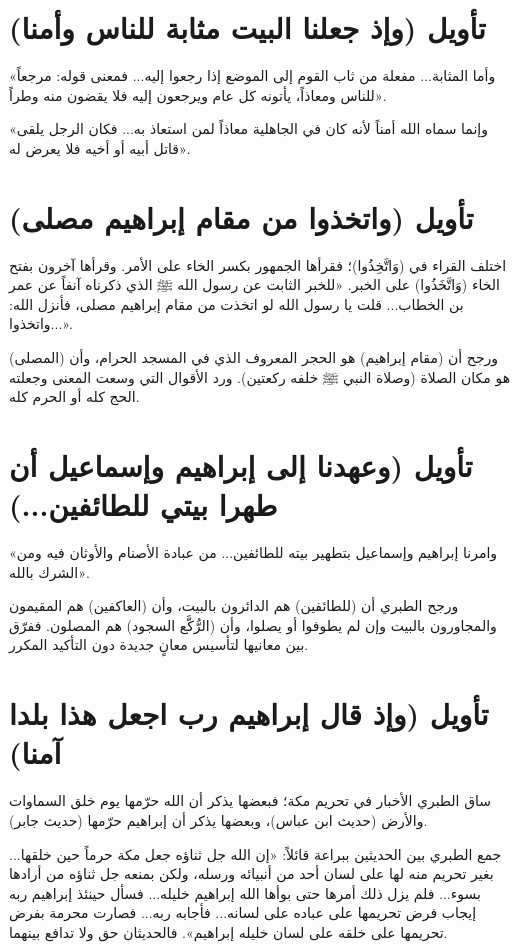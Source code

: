 \separator

\section{تأويل (وإذ جعلنا البيت مثابة للناس وأمنا)}
 «وأما المثابة... مفعلة من ثاب القوم إلى الموضع إذا رجعوا إليه... فمعنى قوله: مرجعاً للناس ومعاذاً، يأتونه كل عام ويرجعون إليه فلا يقضون منه وطراً».

 «وإنما سماه الله أمناً لأنه كان في الجاهلية معاذاً لمن استعاذ به... فكان الرجل يلقى قاتل أبيه أو أخيه فلا يعرض له».

\separator

\section{تأويل (واتخذوا من مقام إبراهيم مصلى)}
اختلف القراء في (وَاتَّخِذُوا)؛ فقرأها الجمهور بكسر الخاء على الأمر. وقرأها آخرون بفتح الخاء (وَاتَّخَذُوا) على الخبر.
 «للخبر الثابت عن رسول الله ﷺ الذي ذكرناه آنفاً عن عمر بن الخطاب... قلت يا رسول الله لو اتخذت من مقام إبراهيم مصلى، فأنزل الله: واتخذوا...».

ورجح أن (مقام إبراهيم) هو الحجر المعروف الذي في المسجد الحرام، وأن (المصلى) هو مكان الصلاة (وصلاة النبي ﷺ خلفه ركعتين). ورد الأقوال التي وسعت المعنى وجعلته الحج كله أو الحرم كله.

\separator

\section{تأويل (وعهدنا إلى إبراهيم وإسماعيل أن طهرا بيتي للطائفين...)}
 «وامرنا إبراهيم وإسماعيل بتطهير بيته للطائفين... من عبادة الأصنام والأوثان فيه ومن الشرك بالله».

ورجح الطبري أن (للطائفين) هم الدائرون بالبيت، وأن (العاكفين) هم المقيمون والمجاورون بالبيت وإن لم يطوفوا أو يصلوا، وأن (الرُّكَّع السجود) هم المصلون. ففرّق بين معانيها لتأسيس معانٍ جديدة دون التأكيد المكرر.

\separator

\section{تأويل (وإذ قال إبراهيم رب اجعل هذا بلدا آمنا)}
ساق الطبري الأخبار في تحريم مكة؛ فبعضها يذكر أن الله حرّمها يوم خلق السماوات والأرض (حديث ابن عباس)، وبعضها يذكر أن إبراهيم حرّمها (حديث جابر). 
\begin{fawaid}
جمع الطبري بين الحديثين ببراعة قائلاً: «إن الله جل ثناؤه جعل مكة حرماً حين خلقها... بغير تحريم منه لها على لسان أحد من أنبيائه ورسله، ولكن بمنعه جل ثناؤه من أرادها بسوء... فلم يزل ذلك أمرها حتى بوأها الله إبراهيم خليله... فسأل حينئذ إبراهيم ربه إيجاب فرض تحريمها على عباده على لسانه... فأجابه ربه... فصارت محرمة بفرض تحريمها على خلقه على لسان خليله إبراهيم». فالحديثان حق ولا تدافع بينهما.
\end{fawaid}

